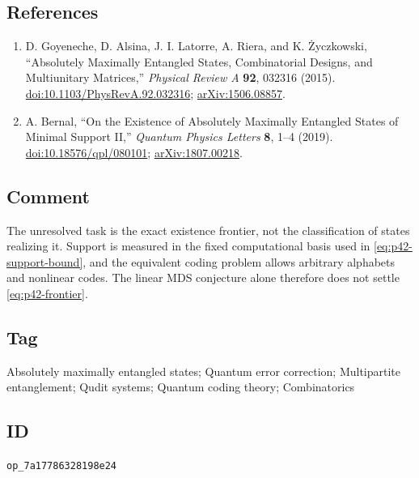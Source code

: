 \subsection*{References}

\begin{enumerate}[label={},leftmargin=4.8em,labelsep=0.5em]
  \footnotesize
  \item[\textup{[GAL+15]}]\label{ref:p42-goyeneche}
  D. Goyeneche, D. Alsina, J. I. Latorre, A. Riera, and K. \.{Z}yczkowski,
  ``Absolutely Maximally Entangled States, Combinatorial Designs, and
  Multiunitary Matrices,'' \emph{Physical Review A} \textbf{92}, 032316
  (2015).
  \href{https://doi.org/10.1103/PhysRevA.92.032316}%
       {doi:10.1103/PhysRevA.92.032316};
  \href{https://arxiv.org/abs/1506.08857}{arXiv:1506.08857}.

  \item[\textup{[Ber19]}]\label{ref:p42-bernal}
  A. Bernal, ``On the Existence of Absolutely Maximally Entangled States of
  Minimal Support II,'' \emph{Quantum Physics Letters} \textbf{8}, 1--4
  (2019).
  \href{https://doi.org/10.18576/qpl/080101}{doi:10.18576/qpl/080101};
  \href{https://arxiv.org/abs/1807.00218}{arXiv:1807.00218}.
\end{enumerate}

\subsection*{Comment}

The unresolved task is the exact existence frontier, not the classification
of states realizing it.  Support is measured in the fixed computational
basis used in \eqref{eq:p42-support-bound}, and the equivalent coding problem
allows arbitrary alphabets and nonlinear codes.  The linear MDS conjecture
alone therefore does not settle \eqref{eq:p42-frontier}.

\subsection*{Tag}

Absolutely maximally entangled states; Quantum error correction; Multipartite
entanglement; Qudit systems; Quantum coding theory; Combinatorics

\subsection*{ID}

\texttt{op\_7a17786328198e24}
